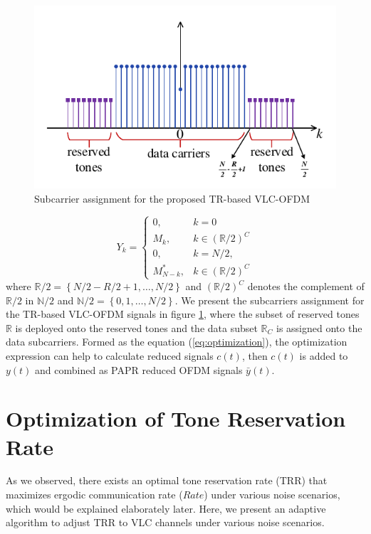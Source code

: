 \documentclass[9pt,twocolumn,twoside]{osajnl}
\begin{document}
\begin{figure}[t]
  \centering
  \includegraphics[width=\linewidth]{figures/Subcarriers.pdf}
  \caption{Subcarrier assignment for the proposed TR-based VLC-OFDM}
  \label{fig:subcarriers}
\end{figure}

\begin{equation}
  Y_k = \left\{ \begin{array}{ll}
    0, & k=0 \\
    M_k, & k \in {\left(\mathbb{R}/2\right)}^C \\
    0, & k=N/2, \\
    M_{N-k}^*, & k \in {\left(\mathbb{R}/2\right)}^C
  \end{array} \right.
\end{equation}
where $\mathbb{R}/2=\left\{N/2-R/2+1,\ldots,N/2\right\}$ and ${\left(\mathbb{R}/2\right)}^C$ denotes the complement of $\mathbb{R}/2$ in $\mathbb{N}/2$ and 
$\mathbb{N}/2=\left\{0,1,\ldots,N/2\right\}$. We present the subcarriers assignment for the TR-based 
VLC-OFDM signals in figure \ref{fig:subcarriers}, where the subset of reserved tones $\mathbb{R}$ is deployed onto the reserved tones 
and the data subset $\mathbb{R}_C$ is assigned onto the data subcarriers. Formed as the equation (\ref{eq:optimization}), the optimization expression can help 
to calculate reduced signals $c(t)$, then $c(t)$ is added to $y(t)$ and combined as PAPR reduced OFDM signals $\bar{y}(t)$.


\section{Optimization of Tone Reservation Rate}

As we observed, there exists an optimal tone reservation rate (TRR) that maximizes ergodic communication rate ($Rate$) under various noise scenarios, which would be explained elaborately later. 
Here, we present an adaptive algorithm to adjust TRR to VLC channels under various noise scenarios.
\end{document}
